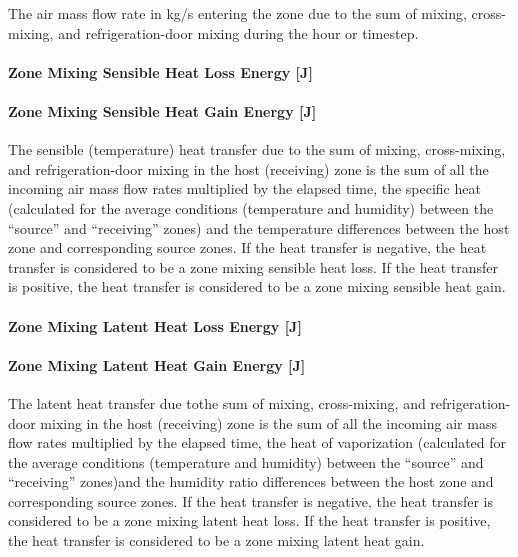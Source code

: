 The air mass flow rate in kg/s entering the zone due to the sum of mixing, cross-mixing, and refrigeration-door mixing during the hour or timestep.

\paragraph{Zone Mixing Sensible Heat Loss Energy {[}J{]}}\label{zone-mixing-sensible-heat-loss-energy-j-1}

\paragraph{Zone Mixing Sensible Heat Gain Energy {[}J{]}}\label{zone-mixing-sensible-heat-gain-energy-j-1}

The sensible (temperature) heat transfer due to the sum of mixing, cross-mixing, and refrigeration-door mixing in the host (receiving) zone is the sum of all the incoming air mass flow rates multiplied by the elapsed time, the specific heat (calculated for the average conditions (temperature and humidity) between the ``source'' and ``receiving'' zones) and the temperature differences between the host zone and corresponding source zones. If the heat transfer is negative, the heat transfer is considered to be a zone mixing sensible heat loss. If the heat transfer is positive, the heat transfer is considered to be a zone mixing sensible heat gain.

\paragraph{Zone Mixing Latent Heat Loss Energy {[}J{]}}\label{zone-mixing-latent-heat-loss-energy-j-1}

\paragraph{Zone Mixing Latent Heat Gain Energy {[}J{]}}\label{zone-mixing-latent-heat-gain-energy-j-1}

The latent heat transfer due tothe sum of mixing, cross-mixing, and refrigeration-door mixing in the host (receiving) zone is the sum of all the incoming air mass flow rates multiplied by the elapsed time, the heat of vaporization (calculated for the average conditions (temperature and humidity) between the ``source'' and ``receiving'' zones)and the humidity ratio differences between the host zone and corresponding source zones. If the heat transfer is negative, the heat transfer is considered to be a zone mixing latent heat loss. If the heat transfer is positive, the heat transfer is considered to be a zone mixing latent heat gain.

